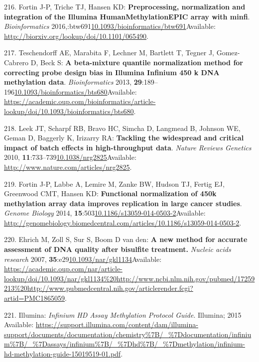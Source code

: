 \documentclass[
]{book}
\begin{document}
\leavevmode\hypertarget{ref-Fortin2016}{}%
216. Fortin J-P, Triche TJ, Hansen KD: \textbf{Preprocessing, normalization and integration of the Illumina HumanMethylationEPIC array with minfi}. \emph{Bioinformatics} 2016,:btw691\href{https://doi.org/10.1093/bioinformatics/btw691}{10.1093/bioinformatics/btw691}Available: \url{http://biorxiv.org/lookup/doi/10.1101/065490}.

\leavevmode\hypertarget{ref-Teschendorff2013}{}%
217. Teschendorff AE, Marabita F, Lechner M, Bartlett T, Tegner J, Gomez-Cabrero D, Beck S: \textbf{A beta-mixture quantile normalization method for correcting probe design bias in Illumina Infinium 450 k DNA methylation data}. \emph{Bioinformatics} 2013, \textbf{29}:189--196\href{https://doi.org/10.1093/bioinformatics/bts680}{10.1093/bioinformatics/bts680}Available: \url{https://academic.oup.com/bioinformatics/article-lookup/doi/10.1093/bioinformatics/bts680}.

\leavevmode\hypertarget{ref-Leek2010}{}%
218. Leek JT, Scharpf RB, Bravo HC, Simcha D, Langmead B, Johnson WE, Geman D, Baggerly K, Irizarry RA: \textbf{Tackling the widespread and critical impact of batch effects in high-throughput data}. \emph{Nature Reviews Genetics} 2010, \textbf{11}:733--739\href{https://doi.org/10.1038/nrg2825}{10.1038/nrg2825}Available: \url{http://www.nature.com/articles/nrg2825}.

\leavevmode\hypertarget{ref-Fortin2014}{}%
219. Fortin J-P, Labbe A, Lemire M, Zanke BW, Hudson TJ, Fertig EJ, Greenwood CMT, Hansen KD: \textbf{Functional normalization of 450k methylation array data improves replication in large cancer studies}. \emph{Genome Biology} 2014, \textbf{15}:503\href{https://doi.org/10.1186/s13059-014-0503-2}{10.1186/s13059-014-0503-2}Available: \url{http://genomebiology.biomedcentral.com/articles/10.1186/s13059-014-0503-2}.

\leavevmode\hypertarget{ref-Ehrich2007}{}%
220. Ehrich M, Zoll S, Sur S, Boom D van den: \textbf{A new method for accurate assessment of DNA quality after bisulfite treatment.} \emph{Nucleic acids research} 2007, \textbf{35}:e29\href{https://doi.org/10.1093/nar/gkl1134}{10.1093/nar/gkl1134}Available: \url{https://academic.oup.com/nar/article-lookup/doi/10.1093/nar/gkl1134\%20http://www.ncbi.nlm.nih.gov/pubmed/17259213\%20http://www.pubmedcentral.nih.gov/articlerender.fcgi?artid=PMC1865059}.

\leavevmode\hypertarget{ref-Illumina2015}{}%
221. Illumina: \emph{Infinium HD Assay Methylation Protocol Guide}. Illumina; 2015 Available: \url{https://support.illumina.com/content/dam/illumina-support/documents/documentation/chemistry\%7B/_\%7Ddocumentation/infinium\%7B/_\%7Dassays/infinium\%7B/_\%7Dhd\%7B/_\%7Dmethylation/infinium-hd-methylation-guide-15019519-01.pdf}.
\end{document}
